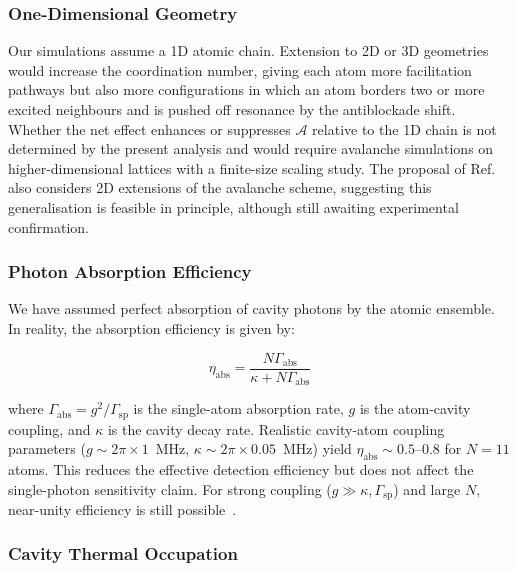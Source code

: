 \subsubsection{One-Dimensional Geometry}

Our simulations assume a 1D atomic chain. Extension to 2D or 3D geometries would increase the coordination number, giving each atom more facilitation pathways but also more configurations in which an atom borders two or more excited neighbours and is pushed off resonance by the antiblockade shift. Whether the net effect enhances or suppresses $\mathcal{A}$ relative to the 1D chain is not determined by the present analysis and would require avalanche simulations on higher-dimensional lattices with a finite-size scaling study. The proposal of Ref.~\cite{Nill2024} also considers 2D extensions of the avalanche scheme, suggesting this generalisation is feasible in principle, although still awaiting experimental confirmation.

\subsubsection{Photon Absorption Efficiency}

We have assumed perfect absorption of cavity photons by the atomic ensemble. In reality, the absorption efficiency is given by:

\begin{equation}
    \eta_{\mathrm{abs}} = \frac{N \Gamma_{\mathrm{abs}}}{\kappa + N \Gamma_{\mathrm{abs}}}
\end{equation}

where $\Gamma_{\mathrm{abs}} = g^2/\Gamma_{\mathrm{sp}}$ is the single-atom absorption rate, $g$ is the atom-cavity coupling, and $\kappa$ is the cavity decay rate. Realistic cavity-atom coupling parameters ($g \sim 2\pi \times 1$~MHz, $\kappa \sim 2\pi \times 0.05$~MHz) yield $\eta_{\mathrm{abs}} \sim 0.5$--$0.8$ for $N=11$ atoms. This reduces the effective detection efficiency but does not affect the single-photon sensitivity claim. For strong coupling ($g \gg \kappa, \Gamma_{\mathrm{sp}}$) and large $N$, near-unity efficiency is still possible~\cite{Hogan2012}.

\subsubsection{Cavity Thermal Occupation}

